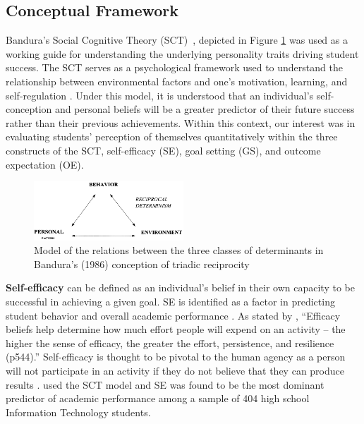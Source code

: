 \documentclass{article}
\begin{document}
\subsection{Conceptual Framework}
\small


Bandura’s Social Cognitive Theory (SCT)~\cite{bandura1986social}, depicted in Figure \ref{fig:bandura} was used as a working guide for understanding the underlying personality traits driving student success. The SCT serves as a psychological framework used to understand the relationship between environmental factors and one's motivation, learning, and self-regulation \cite{schunk2019}. 
Under this model, it is understood that an individual's self-conception and personal beliefs will be a greater predictor of their future success rather than their previous achievements. Within this context, our interest was in evaluating students' perception of themselves quantitatively within the three constructs of the SCT, self-efficacy (SE), goal setting (GS), and outcome expectation (OE).


\begin{figure}[h]
    \centering
    \includegraphics[width=0.5\textwidth]{Figure_1.png}
    \captionsetup{font=scriptsize} %
    \caption{Model of the relations between the three classes of determinants in Bandura's (1986) conception of triadic reciprocity}
    \label{fig:bandura}
\end{figure}
\vspace{-5pt}




\small
\textbf{Self-efficacy} can be defined as an individual's belief in their own capacity to be successful in achieving a given goal. SE is identified as a factor in predicting student behavior and overall academic performance \cite{kozlowski2020measuring}. As stated by \cite{pajares1996self}, “Efficacy beliefs help determine how much effort people will expend on an activity%
-- the higher the sense of efficacy, the greater the effort, persistence, and resilience (p544).” Self-efficacy is thought to be pivotal to the human agency as a person will not participate in an activity if they do not believe that they can produce results \cite{kozlowski2020measuring}. \cite{bogle2018undergraduate} used the SCT model and SE was found to be the most dominant predictor of academic performance among a sample of 404 high school Information Technology students.
\end{document}
